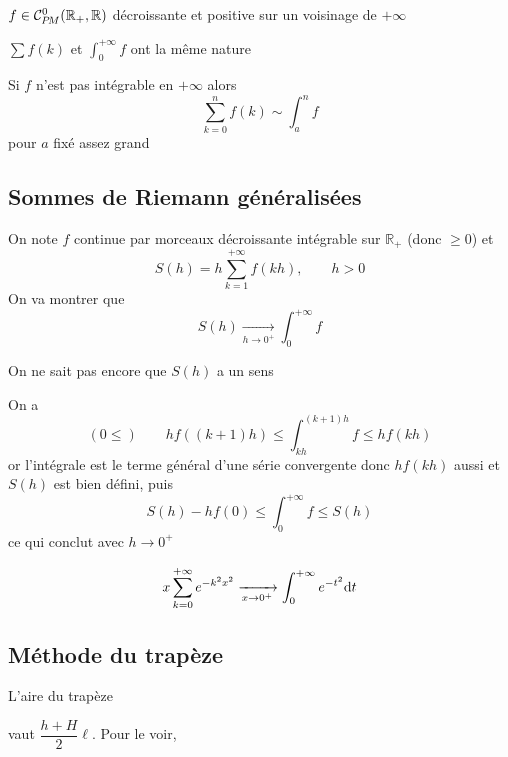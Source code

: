 \begin{prop}
    \Hyp $f\in \CPM(\mathbb R_+, \mathbb R)$ décroissante et positive sur un voisinage de $+\infty$
    \begin{concenum}
    \item $\sum f(k)$ et $\int_0^{+\infty} f$ ont la même nature
    \item Si $f$ n'est pas intégrable en $+\infty$ alors \[
            \sum_{k=0}^nf(k)\sim\int_a^nf
        \]
        pour $a$ fixé assez grand
    \end{concenum}
\end{prop}

\subsection{Sommes de Riemann généralisées}

On note $f$ continue par morceaux décroissante intégrable sur $\mathbb R_+$ (donc $\geq 0$) et \[
    S(h)=h\sum_{k=1}^{+\infty}f(kh), \qquad h>0
\]
On va montrer que \[
    S(h)\xrightarrow[h\to0^+]{} \int_0^{+\infty} f
\]

\begin{rem}
    On ne sait pas encore que $S(h)$ a un sens
\end{rem}

On a \[
    (0\leq) \qquad hf((k+1)h)\leq \int_{kh}^{(k+1)h}f\leq hf(kh)
\]
or l'intégrale est le terme général d'une série convergente donc $hf(kh)$ aussi et $S(h)$ est bien défini, puis \[
    S(h)-hf(0)\leq \int_0^{+\infty}f\leq S(h)
\]
ce qui conclut avec $h\to0^+$

\begin{ex}
    \[
        x\sum_{k=0}^{+\infty}e^{-k^2x^2}\xrightarrow[x\to 0^+]{}\int_0^{+\infty}e^{-t^2}\mathrm{d} t
    \]
\end{ex}

\subsection{Méthode du trapèze}

\begin{rem}
    L'aire du trapèze \hspace{1em}\hspace{1em} vaut $\dfrac{h+H}2\ell$. Pour le voir, 
\end{rem}

